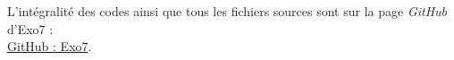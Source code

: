   

\bigskip
\vspace*{\fill}
\begin{center}
L'intégralité des codes \Python{} ainsi que tous les fichiers sources sont sur la page \emph{GitHub} d'Exo7 :\\
\href{https://github.com/exo7math/}{\og{}GitHub : Exo7\fg{}}.
\end{center}





\cleardoublepage
\thispagestyle{empty}
\tableofcontents


